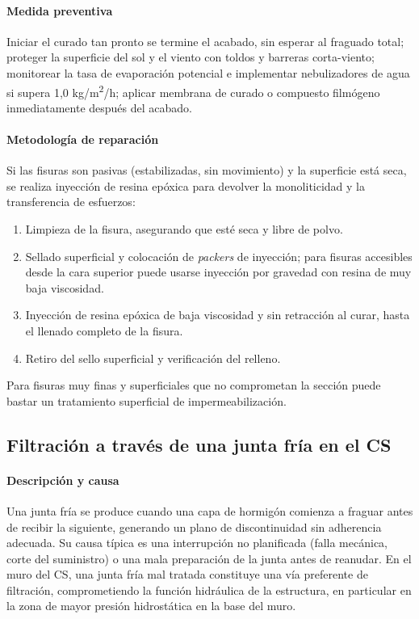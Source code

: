 \paragraph{Medida preventiva}
Iniciar el curado tan pronto se termine el acabado, sin esperar al fraguado total; proteger la superficie del sol y el viento con toldos y barreras corta-viento; monitorear la tasa de evaporación potencial e implementar nebulizadores de agua si supera 1{,}0 kg/m\textsuperscript{2}/h; aplicar membrana de curado o compuesto filmógeno inmediatamente después del acabado.

\paragraph{Metodología de reparación}
Si las fisuras son pasivas (estabilizadas, sin movimiento) y la superficie está seca, se realiza inyección de resina epóxica para devolver la monoliticidad y la transferencia de esfuerzos:
\begin{enumerate}
    \item Limpieza de la fisura, asegurando que esté seca y libre de polvo.
    \item Sellado superficial y colocación de \textit{packers} de inyección; para fisuras accesibles desde la cara superior puede usarse inyección por gravedad con resina de muy baja viscosidad.
    \item Inyección de resina epóxica de baja viscosidad y sin retracción al curar, hasta el llenado completo de la fisura.
    \item Retiro del sello superficial y verificación del relleno.
\end{enumerate}
Para fisuras muy finas y superficiales que no comprometan la sección puede bastar un tratamiento superficial de impermeabilización.

\subsection{Filtración a través de una junta fría en el CS}

\paragraph{Descripción y causa}
Una junta fría se produce cuando una capa de hormigón comienza a fraguar antes de recibir la siguiente, generando un plano de discontinuidad sin adherencia adecuada. Su causa típica es una interrupción no planificada (falla mecánica, corte del suministro) o una mala preparación de la junta antes de reanudar. En el muro del CS, una junta fría mal tratada constituye una vía preferente de filtración, comprometiendo la función hidráulica de la estructura, en particular en la zona de mayor presión hidrostática en la base del muro.

